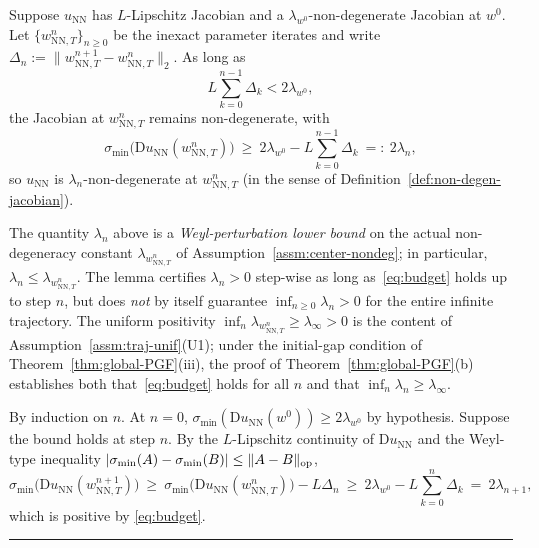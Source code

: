 \documentclass[twoside,11pt]{article}
\newcommand{\BlackBoxProof}{\rule{1.5ex}{1.5ex}}
\renewenvironment{proof}{\par\noindent{\bf Proof\ }}{\hfill\BlackBoxProof\par\medskip}
\newcommand{\D}{\mathrm{D}}
\newcommand{\NN}{\mathrm{NN}}
\begin{document}
\begin{lemma}\label{lem:lambda-decay}
Suppose $u_\NN$ has $L$-Lipschitz Jacobian and a $\lambda_{w^0}$-non-degenerate Jacobian
at $w^0$. Let $\{w^n_{\NN,T}\}_{n\ge 0}$ be the inexact parameter iterates and write
$\Delta_n := \|w^{n+1}_{\NN,T}-w^n_{\NN,T}\|_2$. As long as
\begin{equation}\label{eq:budget}
L\sum_{k=0}^{n-1}\Delta_k < 2\lambda_{w^0},
\end{equation}
the Jacobian at $w^n_{\NN,T}$ remains non-degenerate, with
\begin{equation*}
\sigma_{\min}\!\big(\D u_\NN(w^n_{\NN,T})\big)
\ \ge\ 2\lambda_{w^0} - L\sum_{k=0}^{n-1}\Delta_k\ =:\ 2\lambda_n,
\end{equation*}
so $u_\NN$ is $\lambda_n$-non-degenerate at $w^n_{\NN,T}$ (in the sense of Definition~\ref{def:non-degen-jacobian}).
\begin{remark}\label{rem:lambda-decay}
The quantity $\lambda_n$ above is a \emph{Weyl-perturbation lower bound} on the actual non-degeneracy constant $\lambda_{w^n_{\NN,T}}$ of Assumption~\ref{assm:center-nondeg}; in particular, $\lambda_n\le\lambda_{w^n_{\NN,T}}$. The lemma certifies $\lambda_n>0$ step-wise as long as~\eqref{eq:budget} holds up to step $n$, but does \emph{not} by itself guarantee $\inf_{n\ge 0}\lambda_n>0$ for the entire infinite trajectory. The uniform positivity $\inf_n\lambda_{w^n_{\NN,T}}\ge\lambda_\infty>0$ is the content of Assumption~\ref{assm:traj-unif}(U1); under the initial-gap condition of Theorem~\ref{thm:global-PGF}(iii), the proof of Theorem~\ref{thm:global-PGF}(b) establishes both that~\eqref{eq:budget} holds for all $n$ and that $\inf_n\lambda_n\ge\lambda_\infty$.
\end{remark}
\end{lemma}

\begin{proof}
By induction on $n$. At $n=0$, $\sigma_{\min}(\D u_\NN(w^0))\ge 2\lambda_{w^0}$ by hypothesis.
Suppose the bound holds at step $n$. By the $L$-Lipschitz continuity of $\D u_\NN$ and the Weyl-type inequality
$|\sigma_{\min}(A)-\sigma_{\min}(B)|\le \|A-B\|_{\rm op}$,
\[
\sigma_{\min}\!\big(\D u_\NN(w^{n+1}_{\NN,T})\big)
\ \ge\ \sigma_{\min}\!\big(\D u_\NN(w^n_{\NN,T})\big) - L\Delta_n
\ \ge\ 2\lambda_{w^0} - L\sum_{k=0}^n\Delta_k\ =\ 2\lambda_{n+1},
\]
which is positive by \eqref{eq:budget}.
\end{proof}
\end{document}
